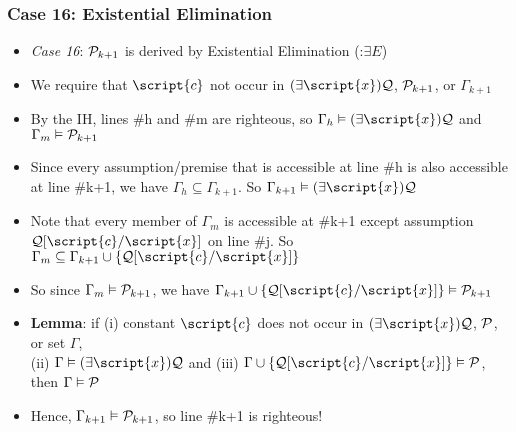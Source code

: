 \begin{frame}
\frametitle{Case 16: Existential Elimination}

\begin{itemize}[<+->]

\item \emph{Case 16}: $\mathcal{P}_{k +1}$ is derived by Existential Elimination (:$\exists E$) %


\item We require that $\script{c}$ not occur in $\qt{\exists}{\script{x}} \metav{Q}$, $\mathcal{P}_{k +1}$, or $\Gamma_{k+1}$



\item By the IH,  lines \#h and \#m are righteous, so $\Gamma_{h} \entails \qt{\exists}{\script{x}} \metav{Q}$ and $\Gamma_{m} \vDash \mathcal{P}_{k +1}$

\item Since every assumption/premise that is accessible at line \#h is also accessible at line \#k+1, we have $\Gamma_h \subseteq \Gamma_{k+1}$. So \alert{$\Gamma_{k+1} \entails  \qt{\exists}{\script{x}} \metav{Q}$}

\item Note that every member of $\Gamma_m$ is accessible at \#k+1 except assumption $\metav{Q}\substitute{\script{x}}{\script{c}}$ on line \#j. So $\Gamma_m  \subseteq \Gamma_{k+1} \cup \{ \metav{Q}\substitute{\script{x}}{\script{c}} \}$

\item So since $\Gamma_{m} \vDash \mathcal{P}_{k +1}$, we have $\Gamma_{k+1} \cup \{ \metav{Q}\substitute{\script{x}}{\script{c}} \} \entails \metav{P}_{k +1}$

\item \textbf{Lemma}: if (i) constant $\script{c}$ does not occur in $\qt{\exists}{\script{x}} \metav{Q}$, $\mathcal{P}$, or set $\Gamma$, \\ (ii) $\Gamma \entails \qt{\exists}{\script{x}} \metav{Q}$ and (iii) $\Gamma \cup \{ \metav{Q}\substitute{\script{x}}{\script{c}} \} \entails \metav{P}$, then $\Gamma \vDash \mathcal{P}$

\item Hence, $\Gamma_{k+1} \vDash \mathcal{P}_{k +1}$, so line \#k+1 is righteous! 


\end{itemize}
\end{frame}

